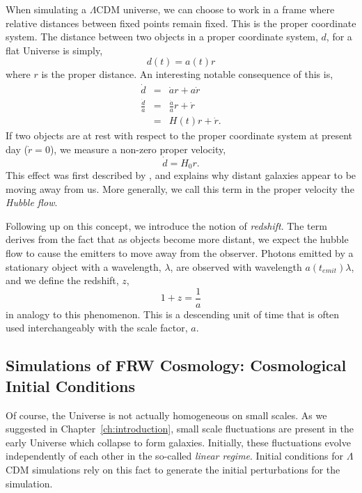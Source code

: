 When simulating a $\Lambda$CDM universe, we can choose to work in a frame where relative distances between fixed points remain fixed. This is the proper coordinate system. The distance between two objects in a proper coordinate system, $d$, for a flat Universe is simply,
\begin{equation}
d(t) = a(t) r \label{eq:comoving_dist}
\end{equation}
where $r$ is the proper distance. An interesting notable consequence of this is,
\begin{eqnarray}
\dot{d} &=& \dot{a} r + a \dot{r} \\
\frac{\dot{d}}{a} &=&  \frac{\dot{a}}{a} r + \dot{r} \\
&=& H(t) r + \dot{r}.
\end{eqnarray}
If two objects are at rest with respect to the proper coordinate system at present day ($\dot{r} = 0$), we measure a non-zero proper velocity,
\begin{equation}
\dot{d} = H_0 r.
\end{equation}
This effect was first described by \citet{hubble_1929}, and explains why distant galaxies appear to be moving away from us. More generally, we call this term in the proper velocity the \textit{Hubble flow}.




Following up on this concept, we introduce the notion of \textit{redshift}. The term derives from the fact that as objects become more distant, we expect the hubble flow to cause the emitters to move away from the observer. Photons emitted by a stationary object with a wavelength, $\lambda$, are observed with wavelength $a(t_{emit}) \lambda$, and we define the redshift, $z$,
\begin{equation}
1 + z = \frac{1}{a}
\end{equation}
in analogy to this phenomenon. This is a descending unit of time that is often used interchangeably with the scale factor, $a$.
\subsection{Simulations of FRW Cosmology: Cosmological Initial Conditions}

Of course, the Universe is not actually homogeneous on small scales. As we suggested in Chapter~\ref{ch:introduction}, small scale fluctuations are present in the early Universe which collapse to form galaxies. Initially, these fluctuations evolve independently of each other in the so-called \textit{linear regime}. Initial conditions for $\Lambda$CDM simulations rely on this fact to generate the initial perturbations for the simulation.

